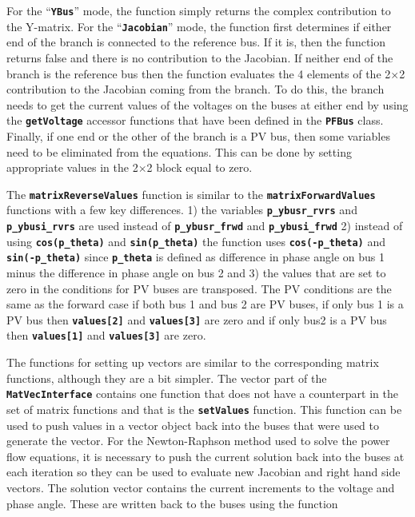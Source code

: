 For the ``\texttt{\textbf{YBus}}'' mode, the function simply returns the complex contribution to the Y-matrix. For the ``\texttt{\textbf{Jacobian}}'' mode, the function first determines if either end of the branch is connected to the reference bus. If it is, then the function returns false and there is no contribution to the Jacobian. If neither end of the branch is the reference bus then the function evaluates the 4 elements of the 2$\mathrm{\times}$2 contribution to the Jacobian coming from the branch. To do this, the branch needs to get the current values of the voltages on the buses at either end by using the \texttt{\textbf{getVoltage}} accessor functions that have been defined in the \texttt{\textbf{PFBus}} class. Finally, if one end or the other of the branch is a PV bus, then some variables need to be eliminated from the equations. This can be done by setting appropriate values in the 2$\mathrm{\times}$2 block equal to zero.

The \texttt{\textbf{matrixReverseValues}} function is similar to the \texttt{\textbf{matrixForwardValues}} functions with a few key differences. 1) the variables \texttt{\textbf{p\_ybusr\_rvrs}} and \texttt{\textbf{p\_ybusi\_rvrs}} are used instead of \texttt{\textbf{p\_ybusr\_frwd}} and \texttt{\textbf{p\_ybusi\_frwd}} 2) instead of using \texttt{\textbf{cos(p\_theta)}} and \texttt{\textbf{sin(p\_theta)}} the function uses \texttt{\textbf{cos(-p\_theta)}} and \texttt{\textbf{sin(-p\_theta)}} since \texttt{\textbf{p\_theta}} is defined as difference in phase angle on bus 1 minus the difference in phase angle on bus 2 and 3) the values that are set to zero in the conditions for PV buses are transposed. The PV conditions are the same as the forward case if both bus 1 and bus 2 are PV buses, if only bus 1 is a PV bus then \texttt{\textbf{values[2]}} and \texttt{\textbf{values[3]}} are zero and if only bus2 is a PV bus then \texttt{\textbf{values[1]}} and \texttt{\textbf{values[3]}} are zero.

The functions for setting up vectors are similar to the corresponding matrix
functions, although they are a bit simpler. The vector part of the
\texttt{\textbf{MatVecInterface}} contains one function that does not have a
counterpart in the set of matrix functions and that is the
\texttt{\textbf{setValues}} function. This function can be used to push values
in a vector object back into the buses that were used to generate the vector.
For the Newton-Raphson method used to solve the power flow equations, it is
necessary to push the current solution back into the buses at each iteration so they can be used to evaluate new Jacobian and right hand side vectors. The solution vector contains the current increments to the voltage and phase angle. These are written back to the buses using the function


